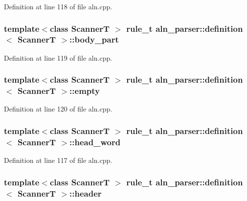 Definition at line 118 of file aln.\+cpp.

\hypertarget{structaln__parser_1_1definition_a64e55f65312e9ed84df5249ea54d45ea}{
\subsubsection[{body\+\_\+part}]{\setlength{\rightskip}{0pt plus 5cm}template$<$class Scanner\+T $>$ {\bf rule\+\_\+t} {\bf aln\+\_\+parser\+::definition}$<$ Scanner\+T $>$\+::body\+\_\+part}}\label{structaln__parser_1_1definition_a64e55f65312e9ed84df5249ea54d45ea}


Definition at line 119 of file aln.\+cpp.

\hypertarget{structaln__parser_1_1definition_afafdb23081539c09e9e4912b558d8332}{
\subsubsection[{empty}]{\setlength{\rightskip}{0pt plus 5cm}template$<$class Scanner\+T $>$ {\bf rule\+\_\+t} {\bf aln\+\_\+parser\+::definition}$<$ Scanner\+T $>$\+::empty}}\label{structaln__parser_1_1definition_afafdb23081539c09e9e4912b558d8332}


Definition at line 120 of file aln.\+cpp.

\hypertarget{structaln__parser_1_1definition_a4ae49d8047c2156cbf75510ef5f3b434}{
\subsubsection[{head\+\_\+word}]{\setlength{\rightskip}{0pt plus 5cm}template$<$class Scanner\+T $>$ {\bf rule\+\_\+t} {\bf aln\+\_\+parser\+::definition}$<$ Scanner\+T $>$\+::head\+\_\+word}}\label{structaln__parser_1_1definition_a4ae49d8047c2156cbf75510ef5f3b434}


Definition at line 117 of file aln.\+cpp.

\hypertarget{structaln__parser_1_1definition_a7c56859f82c03b3f85d16095aea09f65}{
\subsubsection[{header}]{\setlength{\rightskip}{0pt plus 5cm}template$<$class Scanner\+T $>$ {\bf rule\+\_\+t} {\bf aln\+\_\+parser\+::definition}$<$ Scanner\+T $>$\+::header}}\label{structaln__parser_1_1definition_a7c56859f82c03b3f85d16095aea09f65}


